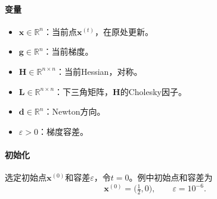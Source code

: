 \paragraph{变量}
\begin{itemize}
 \item $\bm{x}\in\mathbb{R}^n$：当前点$\bm{x}^{(t)}$，在原处更新。
 \item $\bm{g}\in\mathbb{R}^n$：当前梯度。
 \item $\bm{H}\in\mathbb{R}^{n\times n}$：当前Hessian，对称。
 \item $\bm{L}\in\mathbb{R}^{n\times n}$：下三角矩阵，$\bm{H}$的Cholesky因子。
 \item $\bm{d}\in\mathbb{R}^n$：Newton方向。
 \item $\varepsilon>0$：梯度容差。
\end{itemize}

\paragraph{初始化}
选定初始点$\bm{x}^{(0)}$和容差$\varepsilon$，令$t=0$。例中初始点和容差为
\[
 \bm{x}^{(0)}=\bigl(\tfrac12,0\bigr),\qquad \varepsilon=10^{-6}.
\]

